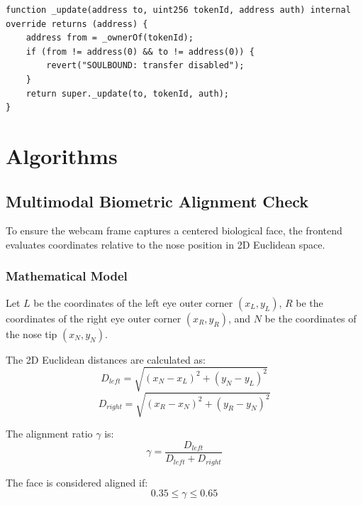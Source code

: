 \documentclass[12pt,a4paper,oneside]{report}
\begin{document}
\begin{lstlisting}[language=Solidity, caption=SBT Hook Override]
function _update(address to, uint256 tokenId, address auth) internal override returns (address) {
    address from = _ownerOf(tokenId);
    if (from != address(0) && to != address(0)) {
        revert("SOULBOUND: transfer disabled");
    }
    return super._update(to, tokenId, auth);
}
\end{lstlisting}

\newpage

\chapter{Algorithms}

\section{Multimodal Biometric Alignment Check}
To ensure the webcam frame captures a centered biological face, the frontend evaluates coordinates relative to the nose position in 2D Euclidean space.

\subsection{Mathematical Model}
Let $L$ be the coordinates of the left eye outer corner $(x_L, y_L)$, $R$ be the coordinates of the right eye outer corner $(x_R, y_R)$, and $N$ be the coordinates of the nose tip $(x_N, y_N)$.

The 2D Euclidean distances are calculated as:
\begin{equation}
    D_{left} = \sqrt{(x_N - x_L)^2 + (y_N - y_L)^2}
\end{equation}
\begin{equation}
    D_{right} = \sqrt{(x_R - x_N)^2 + (y_R - y_N)^2}
\end{equation}

The alignment ratio $\gamma$ is:
\begin{equation}
    \gamma = \frac{D_{left}}{D_{left} + D_{right}}
\end{equation}

The face is considered aligned if:
\begin{equation}
    0.35 \le \gamma \le 0.65
\end{equation}
\end{document}

